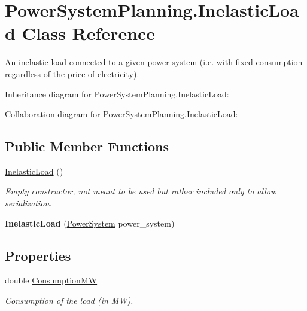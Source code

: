 \hypertarget{class_power_system_planning_1_1_inelastic_load}{}\section{Power\+System\+Planning.\+Inelastic\+Load Class Reference}
\label{class_power_system_planning_1_1_inelastic_load}


An inelastic load connected to a given power system (i.\+e. with fixed consumption regardless of the price of electricity).  




Inheritance diagram for Power\+System\+Planning.\+Inelastic\+Load\+:


Collaboration diagram for Power\+System\+Planning.\+Inelastic\+Load\+:
\subsection*{Public Member Functions}
\begin{DoxyCompactItemize}
\item 
\hyperlink{class_power_system_planning_1_1_inelastic_load_a47abae64f9f66d537230cdff873d9efa}{Inelastic\+Load} ()
\begin{DoxyCompactList}\small\item\em Empty constructor, not meant to be used but rather included only to allow serialization. \end{DoxyCompactList}\item 
{\bfseries Inelastic\+Load} (\hyperlink{class_power_system_planning_1_1_power_system}{Power\+System} power\+\_\+system)\hypertarget{class_power_system_planning_1_1_inelastic_load_a8ff8d78ce9c7189100619c82f0038a61}{}\label{class_power_system_planning_1_1_inelastic_load_a8ff8d78ce9c7189100619c82f0038a61}

\end{DoxyCompactItemize}
\subsection*{Properties}
\begin{DoxyCompactItemize}
\item 
double \hyperlink{class_power_system_planning_1_1_inelastic_load_ad37cc0084cc3307039345b7d683bd51d}{Consumption\+MW}
\begin{DoxyCompactList}\small\item\em Consumption of the load (in MW). \end{DoxyCompactList}\end{DoxyCompactItemize}
